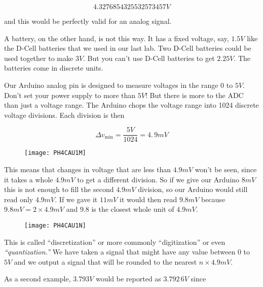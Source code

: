\begin{equation*}
	4.3276854325532573457\unit{V}
\end{equation*}

\noindent and this would be perfectly valid for an analog signal.

A battery, on the other hand, is not this way. It has a fixed voltage, say, $1.5\unit{V}$ like the D-Cell batteries that we used in our last lab. Two D-Cell batteries could be used together to make $3\unit{V}.$ But you can't use D-Cell batteries to get $2.25\unit{V}.$ The batteries come in discrete units.

Our Arduino analog pin is designed to measure voltages in the range $0$ to $5\unit{V}.$ Don't set your power supply to more than $5\unit{V}!$ But there is more to the ADC than just a voltage range. The Arduino chops the voltage range into 1024 discrete voltage divisions. Each division is then

\begin{equation*}
	\Delta v_{\min }=\frac{5\unit{V}}{1024}=4.\,\allowbreak 9\unit{mV}
\end{equation*}

\begin{figure}[h!]
	\centering
	\texttt{[image: PH4CAU1M]}
\end{figure} 

This means that changes in voltage that are less than $4.9\unit{mV}$ won't be seen, since it takes a whole $4.9\unit{mV}$ to get a different division. So if we give our Arduino $8\unit{mV}$ this is not enough to fill the second $4.9\unit{mV}$ division, so our Arduino would still read only $4.9\unit{mV}.$ If we gave it $11\unit{mV}$ it would then read $9.8\unit{mV}$ because $9.8\unit{mV}=2\times 4.9 \unit{mV}$ and $9.8$ is the closest whole unit of $4.9\unit{mV}.$

\begin{figure}[h!]
    \centering
    \texttt{[image: PH4CAU1N]}
\end{figure}

This is called ``discretization'' or more commonly ``digitization'' or even \emph{``quantization.'' } We have taken a signal that might have any value between $0$ to $5\unit{V}$ and we output a signal that will be rounded to the nearest $n\times 4.9\unit{mV}.$

As a second example, $3.793\unit{V}$ would be reported as $\allowbreak 3.792\,\allowbreak 6\unit{V}$ since 

